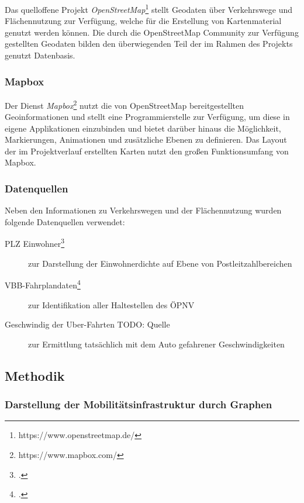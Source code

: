Das quelloffene Projekt \emph{OpenStreetMap}\footnote{https://www.openstreetmap.de/} stellt Geodaten über Verkehrswege und Flächennutzung zur Verfügung, welche für die Erstellung von Kartenmaterial genutzt werden können. Die durch die OpenStreetMap Community zur Verfügung gestellten Geodaten bilden den überwiegenden Teil der im Rahmen des Projekts genutzt Datenbasis.

\subsubsection{Mapbox}
\label{mapbox}

Der Dienst \emph{Mapbox}\footnote{https://www.mapbox.com/} nutzt die von OpenStreetMap bereitgestellten Geoinformationen und stellt eine Programmierstelle zur Verfügung, um diese in eigene Applikationen einzubinden und bietet darüber hinaus die Möglichkeit, Markierungen, Animationen und zusätzliche Ebenen zu definieren. Das Layout der im Projektverlauf erstellten Karten nutzt den großen Funktionsumfang von Mapbox.

\subsubsection{Datenquellen}
\label{datenquellen}

Neben den Informationen zu Verkehrswegen und der Flächennutzung wurden folgende Datenquellen verwendet:

\begin{description}
    \item[PLZ Einwohner\footcite{Einwohnerdaten}] zur Darstellung der Einwohnerdichte auf Ebene von Postleitzahlbereichen
    \item[VBB-Fahrplandaten\footcite{Fahrplandaten}] zur Identifikation aller Haltestellen des \ac{ÖPNV}
    \item[Geschwindig der Uber-Fahrten TODO: Quelle] zur Ermittlung tatsächlich mit dem Auto gefahrener Geschwindigkeiten
\end{description}

\subsection{Methodik}
\label{methodik}

\subsubsection{Darstellung der Mobilitätsinfrastruktur durch Graphen}
\label{darstellung_der_mobiltaetsinfrastruktur_durch_graphen}

